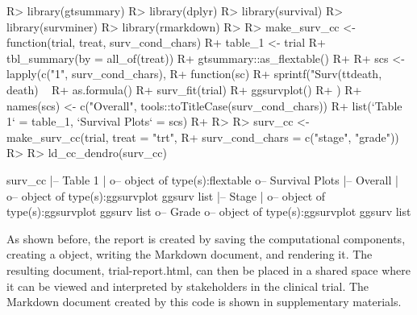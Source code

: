 \documentclass[
]{jss}
\begin{document}
\begin{CodeChunk}

\begin{CodeInput}
R> library(gtsummary)
R> library(dplyr)
R> library(survival)
R> library(survminer)
R> library(rmarkdown)
R> 
R> make_surv_cc <- function(trial, treat, surv_cond_chars) {
R+   table_1 <- trial %
R+     tbl_summary(by = all_of(treat)) %
R+     gtsummary::as_flextable()
R+ 
R+   scs <- lapply(c("1", surv_cond_chars),
R+                 function(sc) {
R+                   sprintf("Surv(ttdeath, death) ~ %
R+                     as.formula() %
R+                     surv_fit(trial) %
R+                     ggsurvplot()
R+                 })
R+   names(scs) <- c("Overall", tools::toTitleCase(surv_cond_chars))
R+   list(`Table 1` = table_1, `Survival Plots` = scs)
R+ }
R> 
R> surv_cc <- make_surv_cc(trial, treat = "trt",
R+                         surv_cond_chars = c("stage", "grade"))
R> 
R> ld_cc_dendro(surv_cc)
\end{CodeInput}

\begin{CodeOutput}

surv_cc
  |-- Table 1
  |  o-- object of type(s):flextable
  o-- Survival Plots
   |-- Overall
   |  o-- object of type(s):ggsurvplot ggsurv list
   |-- Stage
   |  o-- object of type(s):ggsurvplot ggsurv list
   o-- Grade
      o-- object of type(s):ggsurvplot ggsurv list
\end{CodeOutput}
\end{CodeChunk}

As shown before, the report is created by saving the computational
components, creating a  object, writing the 
Markdown document, and rendering it. The resulting document,
trial-report.html, can then be placed in a shared space where it can be
viewed and interpreted by stakeholders in the clinical trial. The
 Markdown document created by this code is shown in
supplementary materials.
\end{document}

